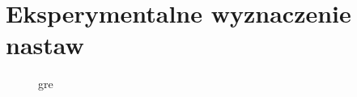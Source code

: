 \chapter{Eksperymentalne wyznaczenie nastaw}

\begin{figure}[H]
    \centering
    
    \caption{gre}
\end{figure}